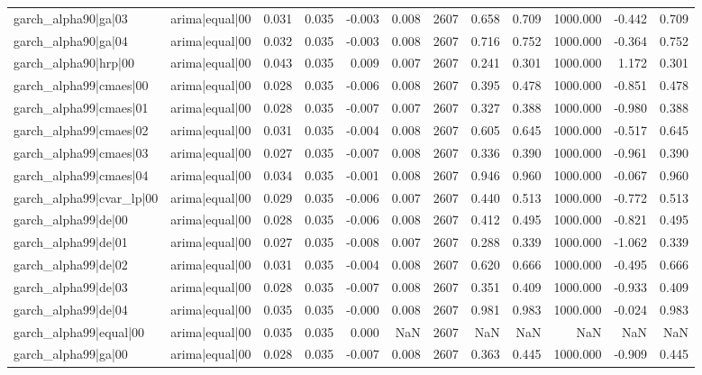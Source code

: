 \begin{table}
\begin{tabular}{llrrrrrrrrrr}
garch\_alpha90|ga|03 & arima|equal|00 & 0.031 & 0.035 & -0.003 & 0.008 & 2607 & 0.658 & 0.709 & 1000.000 & -0.442 & 0.709 \\
garch\_alpha90|ga|04 & arima|equal|00 & 0.032 & 0.035 & -0.003 & 0.008 & 2607 & 0.716 & 0.752 & 1000.000 & -0.364 & 0.752 \\
garch\_alpha90|hrp|00 & arima|equal|00 & 0.043 & 0.035 & 0.009 & 0.007 & 2607 & 0.241 & 0.301 & 1000.000 & 1.172 & 0.301 \\
garch\_alpha99|cmaes|00 & arima|equal|00 & 0.028 & 0.035 & -0.006 & 0.008 & 2607 & 0.395 & 0.478 & 1000.000 & -0.851 & 0.478 \\
garch\_alpha99|cmaes|01 & arima|equal|00 & 0.028 & 0.035 & -0.007 & 0.007 & 2607 & 0.327 & 0.388 & 1000.000 & -0.980 & 0.388 \\
garch\_alpha99|cmaes|02 & arima|equal|00 & 0.031 & 0.035 & -0.004 & 0.008 & 2607 & 0.605 & 0.645 & 1000.000 & -0.517 & 0.645 \\
garch\_alpha99|cmaes|03 & arima|equal|00 & 0.027 & 0.035 & -0.007 & 0.008 & 2607 & 0.336 & 0.390 & 1000.000 & -0.961 & 0.390 \\
garch\_alpha99|cmaes|04 & arima|equal|00 & 0.034 & 0.035 & -0.001 & 0.008 & 2607 & 0.946 & 0.960 & 1000.000 & -0.067 & 0.960 \\
garch\_alpha99|cvar\_lp|00 & arima|equal|00 & 0.029 & 0.035 & -0.006 & 0.007 & 2607 & 0.440 & 0.513 & 1000.000 & -0.772 & 0.513 \\
garch\_alpha99|de|00 & arima|equal|00 & 0.028 & 0.035 & -0.006 & 0.008 & 2607 & 0.412 & 0.495 & 1000.000 & -0.821 & 0.495 \\
garch\_alpha99|de|01 & arima|equal|00 & 0.027 & 0.035 & -0.008 & 0.007 & 2607 & 0.288 & 0.339 & 1000.000 & -1.062 & 0.339 \\
garch\_alpha99|de|02 & arima|equal|00 & 0.031 & 0.035 & -0.004 & 0.008 & 2607 & 0.620 & 0.666 & 1000.000 & -0.495 & 0.666 \\
garch\_alpha99|de|03 & arima|equal|00 & 0.028 & 0.035 & -0.007 & 0.008 & 2607 & 0.351 & 0.409 & 1000.000 & -0.933 & 0.409 \\
garch\_alpha99|de|04 & arima|equal|00 & 0.035 & 0.035 & -0.000 & 0.008 & 2607 & 0.981 & 0.983 & 1000.000 & -0.024 & 0.983 \\
garch\_alpha99|equal|00 & arima|equal|00 & 0.035 & 0.035 & 0.000 & NaN & 2607 & NaN & NaN & NaN & NaN & NaN \\
garch\_alpha99|ga|00 & arima|equal|00 & 0.028 & 0.035 & -0.007 & 0.008 & 2607 & 0.363 & 0.445 & 1000.000 & -0.909 & 0.445 \\

\end{tabular}
\end{table}
